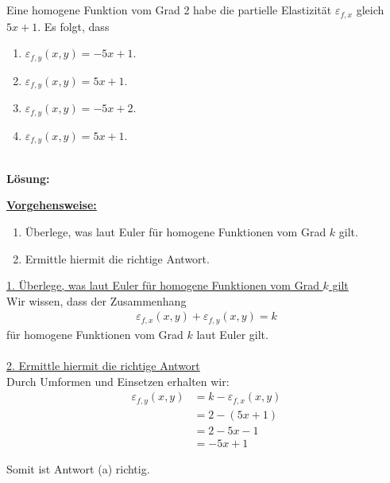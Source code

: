 \subsection*{}
Eine homogene Funktion vom Grad 2 habe die partielle Elastizität 
$\varepsilon_{f,x}$ gleich $5x+1$.
Es folgt, dass
\renewcommand{\labelenumi}{(\alph{enumi})}
\begin{enumerate}
\item $\varepsilon_{f,y}(x,y) = -5x +1$.
\item $\varepsilon_{f,y}(x,y) = 5x +1$.
\item $\varepsilon_{f,y}(x,y) = -5x +2$.
\item $\varepsilon_{f,y}(x,y) = 5x +1$.
\end{enumerate}
\ \\
\textbf{Lösung:}
\begin{mdframed}
\underline{\textbf{Vorgehensweise:}}
\renewcommand{\labelenumi}{\theenumi.}
\begin{enumerate}
\item Überlege, was laut Euler für homogene Funktionen vom Grad $k$ gilt.
\item Ermittle hiermit die richtige Antwort.
\end{enumerate}
\end{mdframed}

\underline{1. Überlege, was laut Euler für homogene Funktionen vom Grad $k$ gilt }\\
Wir wissen, dass der Zusammenhang
\begin{align*}
\varepsilon_{f,x}(x,y) + \varepsilon_{f,y}(x,y) = k
\end{align*}
für homogene Funktionen vom Grad $k$ laut Euler gilt.
\\ 
\\
\underline{2. Ermittle hiermit die richtige Antwort}\\
Durch Umformen und Einsetzen erhalten wir: 
\begin{align*}
\varepsilon_{f,y}(x,y) &= k - \varepsilon_{f,x}(x,y)\\
&= 2 - (5x +1)\\ &= 2 - 5x -1\\  &= -5x +1
\end{align*}

Somit ist Antwort (a) richtig.

\newpage 

